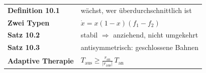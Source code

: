\begin{merksatz}
\begin{center}
\renewcommand{\arraystretch}{1.5}
\begin{tabular}{@{}P{3.0cm}P{5.6cm}@{}}
\toprule
\textbf{Definition 10.1} & wächst, wer überdurchschnittlich ist\\
\textbf{Zwei Typen} & $\dot x = x(1-x)(f_1-f_2)$\\
\textbf{Satz 10.2} & stabil $\Rightarrow$ anziehend, nicht umgekehrt\\
\textbf{Satz 10.3} & antisymmetrisch: geschlossene Bahnen\\
\textbf{Adaptive Therapie} & $T_{\text{aus}} \ge \frac{r_{\text{an}}}{|r_{\text{aus}}|}\,T_{\text{an}}$\\
\bottomrule
\end{tabular}
\end{center}

\begin{center}
\begin{minipage}{0.88\textwidth}
\end{minipage}
\end{center}
\end{merksatz}

